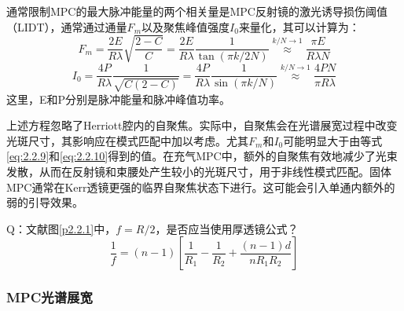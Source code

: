 \documentclass[14pt,a4paper,oneside]{article}
\numberwithin{equation}{subsection}             %
\numberwithin{figure}{subsection}               %
\begin{document}
通常限制MPC的最大脉冲能量的两个相关量是MPC反射镜的激光诱导损伤阈值（LIDT），通常通过通量$F_m$以及聚焦峰值强度$I_0$来量化，其可以计算为：
\begin{equation}
    F_m=\frac{2E}{R\lambda}\sqrt{\frac{2-C}C}=\frac{2E}{R\lambda}\frac1{\tan(\pi k/2N)}\overset{k/N\to1}{\operatorname*{\approx}}\frac{\pi E}{R\lambda N}
    \label{eq:2.2.9}
\end{equation}
\begin{equation}
    I_0=\frac{4P}{R\lambda}\frac1{\sqrt{C(2-C)}}=\frac{4P}{R\lambda}\frac1{\sin(\pi k/N)}\overset{k/N\to1}{\operatorname*{\approx}}\frac{4PN}{\pi R\lambda}
    \label{eq:2.2.10}
\end{equation}
这里，E和P分别是脉冲能量和脉冲峰值功率。

上述方程忽略了Herriott腔内的自聚焦。实际中，自聚焦会在光谱展宽过程中改变光斑尺寸，其影响应在模式匹配中加以考虑。尤其$F_m$和$I_0$可能明显大于由等式\ref{eq:2.2.9}和\ref{eq:2.2.10}得到的值。在充气MPC中，额外的自聚焦有效地减少了光束发散，从而在反射镜和束腰处产生较小的光斑尺寸，用于非线性模式匹配。固体MPC通常在Kerr透镜更强的临界自聚焦状态下进行。这可能会引入单通内额外的弱的引导效果。

Q：文献图\ref{p2.2.1}中，$f=R/2$，是否应当使用厚透镜公式？
\begin{equation}
    \frac{1}{f}=(n-1)\left[\frac{1}{R_1}-\frac{1}{R_2}+\frac{(n-1)d}{nR_1R_2}\right]
    \label{eq:2.2.3}
\end{equation}

\subsubsection{MPC光谱展宽}
\end{document}
